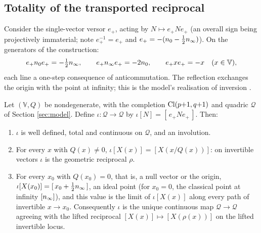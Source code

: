 \subsection{Totality of the transported reciprocal}\label{sec:totality}

Consider the single-vector versor $e_+$, acting by $N \mapsto e_+ N e_+$ (an overall sign being projectively immaterial; note $e_+^{-1} = e_+$ and $e_+ = -(n_0 - \tfrac12n_\infty)$). On the generators of the construction:
\begin{equation}\label{eq:action}
e_+ n_0 e_+ = -\tfrac12 n_\infty, \qquad e_+ n_\infty e_+ = -2n_0, \qquad e_+ x e_+ = -x \quad (x \in \mathbb{V}),
\end{equation}
each line a one-step consequence of anticommutation. The reflection exchanges the origin with the point at infinity; this is the model's realisation of inversion \cite{HLR2001}.

\begin{theorem}[Totality]\label{thm:totality}
Let $(\mathbb{V}, Q)$ be nondegenerate, with the completion $\mathrm{Cl}(p{+}1,q{+}1)$ and quadric $\mathcal{Q}$ of Section \ref{sec:model}. Define $\iota : \mathcal{Q} \to \mathcal{Q}$ by $\iota[N] = [\,e_+ N e_+\,]$. Then:
\begin{enumerate}
\item $\iota$ is well defined, total and continuous on $\mathcal{Q}$, and an involution.
\item For every $x$ with $Q(x) \neq 0$, \; $\iota[X(x)] = [X(x/Q(x))]$: on invertible vectors $\iota$ is the geometric reciprocal $\rho$.
\item For every $x_0$ with $Q(x_0) = 0$, that is, a null vector or the origin, $\iota[X(x_0)] = [\, x_0 + \tfrac12 n_\infty \,]$, an ideal point (for $x_0 = 0$, the classical point at infinity $[n_\infty]$), and this value is the limit of $\iota[X(x)]$ along every path of invertible $x \to x_0$. Consequently $\iota$ is the unique continuous map $\mathcal{Q} \to \mathcal{Q}$ agreeing with the lifted reciprocal $[X(x)] \mapsto [X(\rho(x))]$ on the lifted invertible locus.
\end{enumerate}
\end{theorem}

